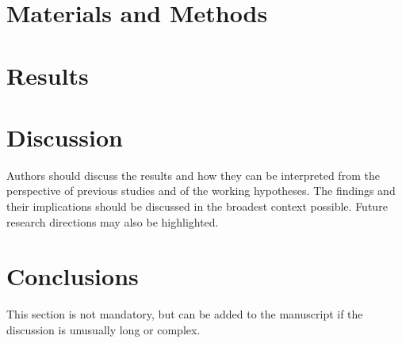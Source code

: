 \documentclass[mathematics,article,submit,pdftex,moreauthors]{Definitions/mdpi}
\begin{document}



\section{Materials and Methods}


\section{Results}



\section{Discussion}

Authors should discuss the results and how they can be interpreted from the perspective of previous studies and of the working hypotheses. The findings and their implications should be discussed in the broadest context possible. Future research directions may also be highlighted.

\section{Conclusions}

This section is not mandatory, but can be added to the manuscript if the discussion is unusually long or complex.



\vspace{6pt} 


\end{document}
